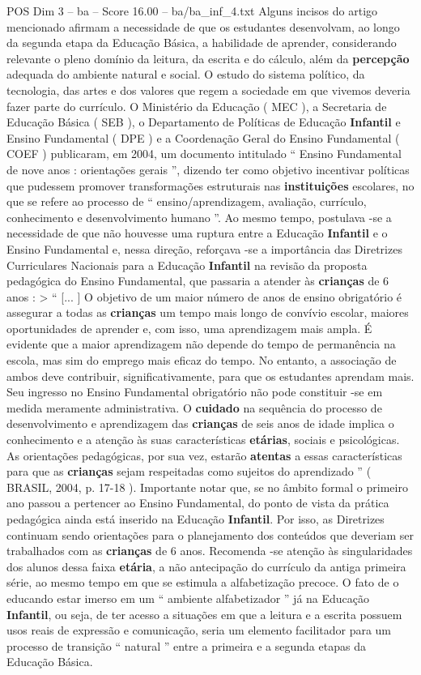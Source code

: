 \begin{textsample}{POS Dim 3 – ba – Score 16.00 – ba/ba\_inf\_4.txt}
Alguns incisos do artigo mencionado afirmam a necessidade de que os estudantes desenvolvam, ao longo da segunda etapa da Educação Básica, a habilidade de aprender, considerando relevante o pleno domínio da leitura, da escrita e do cálculo, além da \textbf{percepção} adequada do ambiente natural e social.
O estudo do sistema político, da tecnologia, das artes e dos valores que regem a sociedade em que vivemos deveria fazer parte do currículo.
O Ministério da Educação ( MEC ), a Secretaria de Educação Básica ( SEB ), o Departamento de Políticas de Educação \textbf{Infantil} e Ensino Fundamental ( DPE ) e a Coordenação Geral do Ensino Fundamental ( COEF ) publicaram, em 2004, um documento intitulado “ Ensino Fundamental de nove anos : orientações gerais ”, dizendo ter como objetivo incentivar políticas que pudessem promover transformações estruturais nas \textbf{instituições} escolares, no que se refere ao processo de “ ensino/aprendizagem, avaliação, currículo, conhecimento e desenvolvimento humano ”.
Ao mesmo tempo, postulava -se a necessidade de que não houvesse uma ruptura entre a Educação \textbf{Infantil} e o Ensino Fundamental e, nessa direção, reforçava -se a importância das Diretrizes Curriculares Nacionais para a Educação \textbf{Infantil} na revisão da proposta pedagógica do Ensino Fundamental, que passaria a atender às \textbf{crianças} de 6 anos : > “ [... ] O objetivo de um maior número de anos de ensino obrigatório é assegurar a todas as \textbf{crianças} um tempo mais longo de convívio escolar, maiores oportunidades de aprender e, com isso, uma aprendizagem mais ampla.
É evidente que a maior aprendizagem não depende do tempo de permanência na escola, mas sim do emprego mais eficaz do tempo.
No entanto, a associação de ambos deve contribuir, significativamente, para que os estudantes aprendam mais.
Seu ingresso no Ensino Fundamental obrigatório não pode constituir -se em medida meramente administrativa.
O \textbf{cuidado} na sequência do processo de desenvolvimento e aprendizagem das \textbf{crianças} de seis anos de idade implica o conhecimento e a atenção às suas características \textbf{etárias}, sociais e psicológicas.
As orientações pedagógicas, por sua vez, estarão \textbf{atentas} a essas características para que as \textbf{crianças} sejam respeitadas como sujeitos do aprendizado ” ( BRASIL, 2004, p. 17-18 ).
Importante notar que, se no âmbito formal o primeiro ano passou a pertencer ao Ensino Fundamental, do ponto de vista da prática pedagógica ainda está inserido na Educação \textbf{Infantil}.
Por isso, as Diretrizes continuam sendo orientações para o planejamento dos conteúdos que deveriam ser trabalhados com as \textbf{crianças} de 6 anos.
Recomenda -se atenção às singularidades dos alunos dessa faixa \textbf{etária}, a não antecipação do currículo da antiga primeira série, ao mesmo tempo em que se estimula a alfabetização precoce.
O fato de o educando estar imerso em um “ ambiente alfabetizador ” já na Educação \textbf{Infantil}, ou seja, de ter acesso a situações em que a leitura e a escrita possuem usos reais de expressão e comunicação, seria um elemento facilitador para um processo de transição “ natural ” entre a primeira e a segunda etapas da Educação Básica.


\end{textsample}
